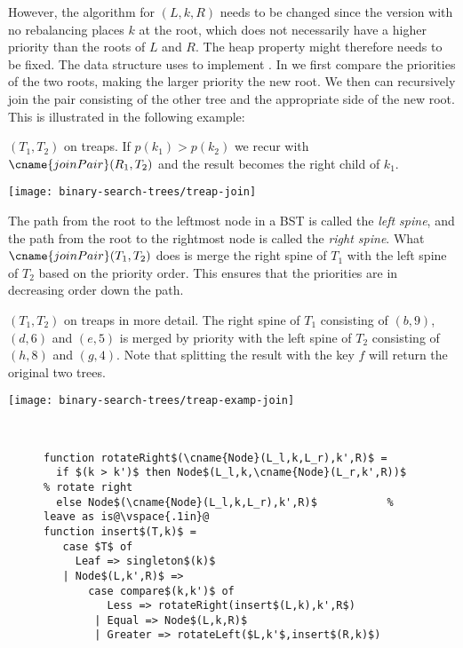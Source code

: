 However, the algorithm for $(L,k,R)$ needs to be changed
since the version with no rebalancing places $k$ at the root, which
does not necessarily have a higher priority than the roots of $L$ and
$R$.  The heap property might therefore needs to be fixed.  The data
structure uses  to implement .  In
 we first compare the priorities of the two roots,
making the larger priority the new root.   We then can recursively join the pair consisting of the
other tree and the appropriate side of the new root.    This is
illustrated in the following example:
\begin{example}
\label{ex:treap-join}
$(T_1,T_2)$ on treaps.  If $p(k_1) >
p(k_2)$ we recur with $\cname{joinPair}(R_1,T_2)$
and the result becomes the right child of $k_1$.
\begin{center}
  \texttt{[image: binary-search-trees/treap-join]}
\end{center}
\end{example}
The path from the root to the leftmost node in a BST is
called the \emph{left spine}, and the path from the root
to the rightmost node is called the \emph{right spine}.   What
$\cname{joinPair}(T_1,T_2)$ does is merge the right spine of $T_1$ with the
left spine of $T_2$ based on the priority order.  This ensures that
the priorities are in decreasing order down the path.
\begin{example}
$(T_1,T_2)$ on treaps in more detail.  The right
spine of $T_1$ consisting of $(b,9)$, $(d,6)$ and $(e,5)$ is merged by
priority with the left spine of $T_2$ consisting of $(h,8)$ and
$(g,4)$.  Note that splitting the result with the key $f$ will return the
original two trees.
\begin{center}
  \texttt{[image: binary-search-trees/treap-examp-join]}
\end{center}
\end{example}

\begin{figure}
\begin{algorithm}~
\label{alg:treapJoin}
\begin{lstlisting}
function rotateRight$(\cname{Node}(L_l,k,L_r),k',R)$ =
  if $(k > k')$ then Node$(L_l,k,\cname{Node}(L_r,k',R))$  % rotate right
  else Node$(\cname{Node}(L_l,k,L_r),k',R)$           % leave as is@\vspace{.1in}@
function insert$(T,k)$ =
   case $T$ of
     Leaf => singleton$(k)$
   | Node$(L,k',R)$ => 
       case compare$(k,k')$ of
          Less => rotateRight(insert$(L,k),k',R$)
        | Equal => Node$(L,k,R)$
        | Greater => rotateLeft($L,k'$,insert$(R,k)$)
\end{lstlisting}
\end{algorithm}
\end{figure}

